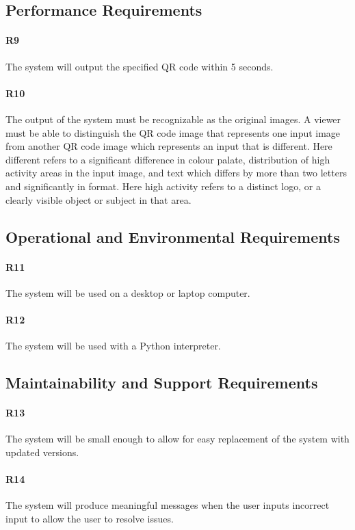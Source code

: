 \documentclass[12pt, titlepage]{article}
\begin{document}
\subsection{Performance Requirements}

	\paragraph{R9}
	The system will output the specified QR code within 5 seconds.
	\paragraph{R10}
	The output of the system must be recognizable as the original images. A 
	viewer must be able to distinguish the QR code image that represents one 
	input image from another QR code image which represents an input that is 
	different. Here	different refers to a significant difference in colour 
	palate, distribution of high activity areas in the input image, and text 
	which differs by more than two letters and significantly in format. Here 
	high activity refers to	a distinct logo, or a clearly visible object or 
	subject in that area.

\subsection{Operational and Environmental Requirements}
	
	\paragraph{R11}
	The system will be used on a desktop or laptop computer.
	\paragraph{R12}
	The system will be used with a Python interpreter.
	
\subsection{Maintainability and Support Requirements}

	\paragraph{R13}
	The system will be small enough to allow for easy replacement of the system 
	with updated versions.
	\paragraph{R14}
	The system will produce meaningful messages when the user inputs incorrect 
	input to allow the user to resolve issues.
\end{document}
